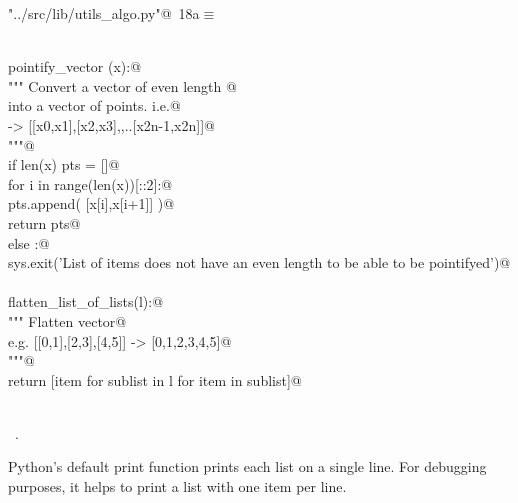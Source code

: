 \documentclass[11.5pt]{report}
\begin{document}
\begin{flushleft} \small\label{scrap10}\raggedright\small
{} \verb@"../src/lib/utils_algo.py"@\nobreak\ {\footnotesize {18a}}$\equiv$
\vspace{-1ex}
\begin{list}{}{} \item
\mbox{}\verb@@\\
\mbox{}\verb@def pointify_vector (x):@\\
\mbox{}\verb@    """ Convert a vector of even length @\\
\mbox{}\verb@    into a vector of points. i.e.@\\
\mbox{}\verb@    [x0,x1,x2,...x2n] -> [[x0,x1],[x2,x3],,..[x2n-1,x2n]]@\\
\mbox{}\verb@    """@\\
\mbox{}\verb@    if len(x) % 2 == 0:@\\
\mbox{}\verb@        pts = []@\\
\mbox{}\verb@        for i in range(len(x))[::2]:@\\
\mbox{}\verb@            pts.append( [x[i],x[i+1]] )@\\
\mbox{}\verb@        return pts@\\
\mbox{}\verb@    else :@\\
\mbox{}\verb@        sys.exit('List of items does not have an even length to be able to be pointifyed')@\\
\mbox{}\verb@@\\
\mbox{}\verb@def flatten_list_of_lists(l):@\\
\mbox{}\verb@    """ Flatten vector@\\
\mbox{}\verb@      e.g.  [[0,1],[2,3],[4,5]] -> [0,1,2,3,4,5]@\\
\mbox{}\verb@    """@\\
\mbox{}\verb@    return [item for sublist in l for item in sublist]@\\
\mbox{}\verb@@\\
\mbox{}\verb@@{\NWsep}
\end{list}
\vspace{-1.5ex}
\footnotesize
\begin{list}{}{\setlength{\itemsep}{-\parsep}\setlength{\itemindent}{-\leftmargin}}
\item \NWtxtFileDefBy\ .

\item{}
\end{list}
\vspace{4ex}
\end{flushleft}
\newchunk Python's default print function prints each list on a single line. For 
debugging purposes,  it helps to print a list with one item per line. 
\end{document}
